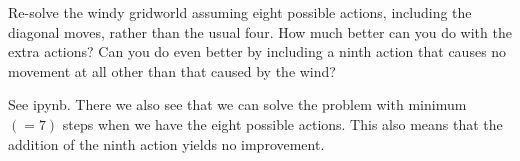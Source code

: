 
\begin{exercise}

Re-solve the windy gridworld assuming eight possible actions, including the diagonal moves, rather than the usual four. How much better can you do with the extra actions? Can you do even better by including a ninth action that causes no movement at all other than that caused by the wind?

\end{exercise}


\begin{solution}

See ipynb. There we also see that we can solve the problem with minimum $(=7)$ steps when we have the eight possible actions. This also means that the addition of the ninth action yields no improvement.

\end{solution}

